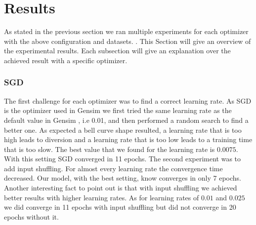 

\section{Results}\label{sec:results}
As stated in the previous section we ran multiple experiments for each optimizer with the above configuration and datasets. . This Section will  give an overview of the experimental results. Each subsection will give an explanation over the achieved result with a specific optimizer.

\subsubsection{SGD}
The first challenge for each optimizer was to find a correct learning rate. As SGD is the optimizer used in Gensim \citep{gensim} we first tried the same learning rate as the default value in Gensim \citep{gensim}, i.e 0.01,  and then performed a random search to find a better one. As expected a bell curve shape resulted, a learning rate that is too high leads to diversion and a learning rate that is too low leads to a training time that is too slow. The best value that we found for the learning rate is $0.0075$. With this setting SGD converged in 11 epochs. The second experiment was to add input shuffling.
For almost every learning rate the convergence time decreased. Our model, with the best setting, know converges in only 7 epochs. Another interesting fact to point out is that with input shuffling we achieved better results with higher learning rates. As for learning rates of $0.01$ and $0.025$ we did converge in 11 epochs with input shuffling but did not converge in 20 epochs without it.

\iffalse 
